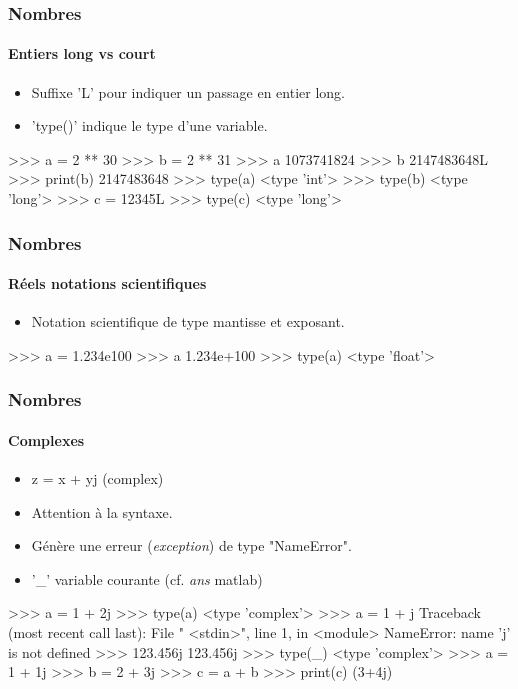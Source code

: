 \begin{frame}[fragile]
\frametitle{Nombres}
\framesubtitle{Entiers long vs court}
\begin{itemize}
 \item Suffixe 'L' pour indiquer un passage en entier long. 
 \item 'type()' indique le type d'une variable. 
\end{itemize}
\begin{pythonConsole}
>>> a = 2 ** 30
>>> b = 2 ** 31
>>> a
1073741824
>>> b
2147483648L
>>> print(b)
2147483648
>>> type(a)
<type 'int'>
>>> type(b)
<type 'long'>
>>> c = 12345L
>>> type(c)
<type 'long'>
\end{pythonConsole}
\end{frame}
\begin{frame}[fragile]
\frametitle{Nombres}
\framesubtitle{Réels notations scientifiques}
\begin{itemize}
 \item Notation scientifique de type mantisse et exposant. 
\end{itemize}
\begin{pythonConsole}
>>> a = 1.234e100
>>> a
1.234e+100
>>> type(a)
<type 'float'>
\end{pythonConsole}
\end{frame}
\begin{frame}[fragile]
\frametitle{Nombres}
\framesubtitle{Complexes}
\begin{itemize}
 \item z = x + yj (complex)
 \item Attention à la syntaxe. 
 \item Génère une erreur (\emph{exception}) de type "NameError". 
 \item '\_' variable courante (cf. \emph{ans} matlab) 
\end{itemize}
\begin{pythonConsole}
>>> a = 1 + 2j
>>> type(a)
<type 'complex'>
>>> a = 1 + j
Traceback (most recent call last):
  File " <stdin>", line 1, in <module>
NameError: name 'j' is not defined
>>> 123.456j
123.456j
>>> type(_)
<type 'complex'>
>>> a = 1 + 1j
>>> b = 2 + 3j
>>> c = a + b
>>> print(c)
(3+4j)
\end{pythonConsole}
\end{frame}
